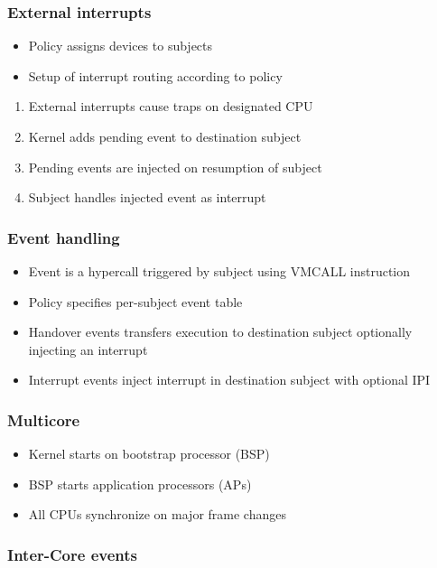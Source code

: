 \documentclass[xcolor={dvipsnames}]{beamer}
\begin{document}
\begin{frame}\frametitle{External interrupts}
\begin{itemize}
	\item Policy assigns devices to subjects
	\item Setup of interrupt routing according to policy
\end{itemize}
\begin{center}
	
\end{center}
\begin{enumerate}
	\item External interrupts cause traps on designated CPU
	\item Kernel adds pending event to destination subject
	\item Pending events are injected on resumption of subject
	\item Subject handles injected event as interrupt
\end{enumerate}
\end{frame}

\begin{frame}[fragile]\frametitle{Event handling}
\begin{itemize}
	\item Event is a hypercall triggered by subject using VMCALL instruction
	\item Policy specifies per-subject event table
	\item Handover events transfers execution to destination subject optionally injecting an interrupt
	\item Interrupt events inject interrupt in destination subject with optional IPI
\end{itemize}

\end{frame}

\begin{frame}\frametitle{Multicore}
\begin{itemize}
	\item Kernel starts on bootstrap processor (BSP)
	\item BSP starts application processors (APs)
	\item All CPUs synchronize on major frame changes
\end{itemize}
	
\end{frame}

\begin{frame}\frametitle{Inter-Core events}
\begin{center}
	
\end{center}
\end{frame}
\end{document}
